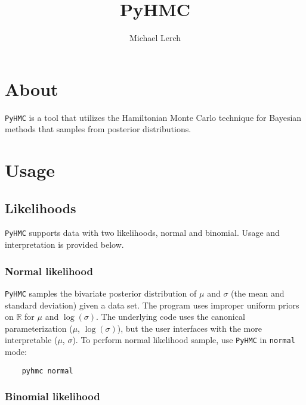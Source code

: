 \documentclass[10pt,letterpaper]{article}
\author{Michael Lerch}
\title{PyHMC}
\date{}
\begin{document}
\maketitle

\section{About}
\label{sec:about}

\texttt{PyHMC} is a tool that utilizes the Hamiltonian Monte Carlo technique
for Bayesian methods that samples from posterior distributions.


\section{Usage}
\label{sec:usage}

\subsection{Likelihoods}
\label{sub:likelihoods}

\texttt{PyHMC} supports data with two likelihoods, normal and binomial.  Usage
and interpretation is provided below.

\subsubsection{Normal likelihood}
\label{ssub:normal_likelihood}

\texttt{PyHMC} samples the bivariate posterior distribution of $\mu$ and
$\sigma$ (the mean and standard deviation) given a data set.  The program uses
improper uniform priors on $\mathbb{R}$ for $\mu$ and $\log(\sigma)$.  The
underlying code uses the canonical parameterization ($\mu$, $\log(\sigma)$),
but the user interfaces with the more interpretable ($\mu$, $\sigma$).  To
perform normal likelihood sample, use \texttt{PyHMC} in \texttt{normal} mode:

\begin{verbatim}
	pyhmc normal
\end{verbatim}


\subsubsection{Binomial likelihood}
\label{ssub:binomial_likelihood}
\end{document}

